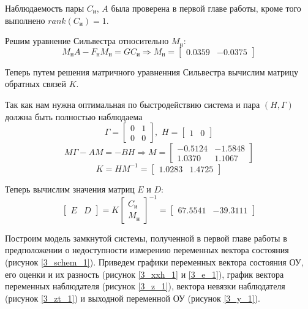 Наблюдаемость пары $C_\text{и}$, $A$ была проверена в первой главе работы, кроме того выполнено $rank \left(C_\text{и}\right) = 1$.

Решим уравнение Сильвестра относительно $M_\text{н}$:
\begin{equation}
	M_\text{н}A - F_\text{н}M_\text{н}= G C_\text{и} \Rightarrow
	M_\text{н} = \begin{bmatrix}
		0.0359&	-0.0375
	\end{bmatrix}
\end{equation}

Теперь путем решения матричного уравненния Сильвестра вычислим матрицу обратных связей $K$.

Так как нам нужна оптимальная по быстродействию система и пара $(H, \Gamma)$ должна быть полностью наблюдаема
\begin{equation}
	\Gamma = \begin{bmatrix}
		0 & 1\\
		0 & 0
	\end{bmatrix}, \, \, 
	H = \begin{bmatrix}
		1 & 0
	\end{bmatrix}
\end{equation}
\begin{equation}
	M \Gamma - AM = -BH \Rightarrow
	M = \begin{bmatrix}
		-0.5124 &	-1.5848\\
		1.0370 &	1.1067
	\end{bmatrix}
\end{equation}
\begin{equation}
	K = HM^{-1} = \begin{bmatrix}
		1.0283 &	1.4725
	\end{bmatrix}
\end{equation}

Теперь вычислим значения матриц $E$ и $D$:
\begin{equation}
	\begin{bmatrix}
		E & D
	\end{bmatrix} = K \begin{bmatrix}
		C_\text{и}\\ M_\text{н}
	\end{bmatrix}^{-1} = \begin{bmatrix}
	67.5541&	-39.3111
	\end{bmatrix}
\end{equation}


Построим модель замкнутой системы, полученной в первой главе работы в предположении о недоступности измерению переменных вектора состояния (рисунок \ref{3_schem_1}). Приведем графики переменных вектора состояния ОУ, его оценки и их разность (рисунок \ref{3_xxh_1} и \ref{3_e_1}), график вектора переменных наблюдателя (рисунок \ref{3_z_1}), вектора невязки наблюдателя (рисунок \ref{3_zt_1}) и выходной переменной ОУ (рисунок \ref{3_y_1}).

